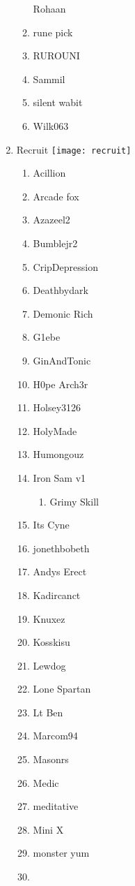 \documentclass{article}
\begin{document}
\begin{enumerate}[I]
\begin{enumerate}[I]
	Rohaan
      \item
	rune pick
      \item
	RUROUNI
      \item
	Sammil
      \item
	silent wabit
      \item
	Wilk063
    \end{enumerate}
  \item
    Recruit \texttt{[image: recruit]}
    \begin{enumerate}[I]
      \item 
	Acillion
      \item
	Arcade fox
      \item
	Azazeel2
      \item
	Bumblejr2
      \item
	CripDepression
      \item
	Deathbydark
      \item
	Demonic Rich
      \item
	G1ebe
      \item
	GinAndTonic
      \item
	H0pe Arch3r
      \item
	Holsey3126
      \item
	HolyMade
      \item
	Humongouz
      \item
	Iron Sam v1
	  \begin{enumerate}[I]
	    \item
	      Grimy Skill
	  \end{enumerate}
      \item
	Its Cyne
      \item
	jonethbobeth
      \item
	Andys Erect
      \item
	Kadircanct
      \item
	Knuxez
      \item
	Kosskisu
      \item
	Lewdog
      \item
	Lone Spartan
      \item
	Lt Ben
      \item
	Marcom94
      \item
	Masonrs
      \item
	Medic
      \item
	meditative
      \item
	Mini X
      \item
	monster yum
      \item

\end{enumerate}
\end{enumerate}
\end{document}
